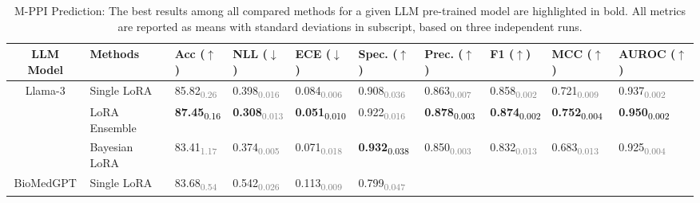 \begin{table*}[htb]
\fontsize{8.75}{11}\selectfont
\centering
\caption{M-PPI Prediction: The best results among all compared methods for a given LLM pre-trained model are highlighted in bold. All metrics are reported as means with standard deviations in subscript, based on three independent runs.}
\label{table:m-ppi}
\begin{tabular}{c|l|*{8}{l}} %
\toprule
LLM Model & Methods & Acc ($\uparrow$) & NLL ($\downarrow$) & ECE ($\downarrow$) & Spec. ($\uparrow$) & Prec. ($\uparrow$) & F1 ($\uparrow$) & MCC ($\uparrow$) & AUROC ($\uparrow$) \\
\midrule
\multirow{3}{*}{Llama-3} & Single LoRA & 
85.82\textsubscript{\textcolor{gray}{0.26}} & 0.398\textsubscript{\textcolor{gray}{0.016}} & 
0.084\textsubscript{\textcolor{gray}{0.006}} & 0.908\textsubscript{\textcolor{gray}{0.036}} & 
0.863\textsubscript{\textcolor{gray}{0.007}} & 0.858\textsubscript{\textcolor{gray}{0.002}} & 
0.721\textsubscript{\textcolor{gray}{0.009}} & 0.937\textsubscript{\textcolor{gray}{0.002}} \\
& LoRA Ensemble & 
\textbf{87.45}\textsubscript{\textcolor{black}{0.16}} & \textbf{0.308}\textsubscript{\textcolor{gray}{0.013}} & 
\textbf{0.051}\textsubscript{\textcolor{black}{0.010}} & 0.922\textsubscript{\textcolor{gray}{0.016}} & 
\textbf{0.878}\textsubscript{\textcolor{black}{0.003}} & \textbf{0.874}\textsubscript{\textcolor{black}{0.002}} & 
\textbf{0.752}\textsubscript{\textcolor{black}{0.004}} & \textbf{0.950}\textsubscript{\textcolor{black}{0.002}} \\  
& Bayesian LoRA & 
83.41\textsubscript{\textcolor{gray}{1.17}} & 0.374\textsubscript{\textcolor{gray}{0.005}} & 
0.071\textsubscript{\textcolor{gray}{0.018}} & \textbf{0.932}\textsubscript{\textcolor{black}{0.038}} & 
0.850\textsubscript{\textcolor{gray}{0.003}} & 0.832\textsubscript{\textcolor{gray}{0.013}} & 
0.683\textsubscript{\textcolor{gray}{0.013}} & 0.925\textsubscript{\textcolor{gray}{0.004}} \\ 
\midrule
\multirow{3}{*}{BioMedGPT} & Single LoRA & 
83.68\textsubscript{\textcolor{gray}{0.54}} & 0.542\textsubscript{\textcolor{gray}{0.026}} & 
0.113\textsubscript{\textcolor{gray}{0.009}} & 0.799\textsubscript{\textcolor{gray}{0.047}} & 

\end{tabular}
\end{table*}
